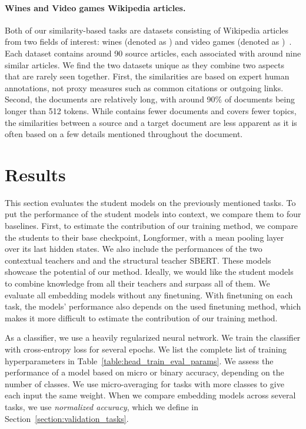 \paragraph{Wines and Video games Wikipedia articles.} Both of our
similarity-based tasks are datasets consisting of Wikipedia articles from two
fields of interest: wines (denoted as ) and video games (denoted
as )~\citep{ginzburg2021self}. Each dataset contains around 90
source articles, each associated with around nine similar articles. We find the two
datasets unique as they combine two aspects that are rarely seen together. First, the
similarities are based on expert human annotations, not proxy measures
such as common citations or outgoing links. Second, the documents are
relatively long, with around 90\% of documents being longer than 512 tokens.
While  contains fewer documents and covers fewer topics, the
similarities between a source and a target document are less apparent as it is
often based on a few details mentioned throughout the document.

\section{Results}\label{section:eval_results}

This section evaluates the student models on the previously mentioned tasks. To
put the performance of the student models into context, we compare them to four
baselines. First, to estimate the contribution of our training method, we
compare the students to their base checkpoint, Longformer, with a mean pooling
layer over its last hidden states. We also include the performances of the two
contextual teachers  and  and the structural teacher SBERT.
These models showcase the potential of our method. Ideally, we would like the
student models to combine knowledge from all their teachers and surpass all of
them. We evaluate all embedding models without any finetuning. With finetuning
on each task, the models' performance also depends on the used finetuning
method, which makes it more difficult to estimate the contribution of our
training method.

As a classifier, we use a heavily regularized neural network. We train the
classifier with cross-entropy loss for several epochs. We list the complete
list of training hyperparameters in Table~\ref{table:head_train_eval_params}.
We assess the performance of a model based on micro or binary accuracy,
depending on the number of classes. We use micro-averaging for tasks with more
classes to give each input the same weight. When we compare embedding models
across several tasks, we use \emph{normalized accuracy}, which we define in
Section~\ref{section:validation_tasks}.

